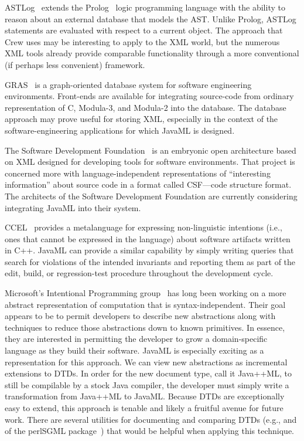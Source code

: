 \documentclass{article}
\begin{document}
\begin{multicols}{2}
ASTLog~\cite{Crew97} extends the Prolog~\cite{Clock94} logic programming
language with the ability to reason about an external database that
models the AST.  Unlike Prolog, ASTLog statements are evaluated with
respect to a current object.  The approach that Crew uses may be
interesting to apply to the XML world, but the numerous XML tools
already provide comparable functionality through a more conventional (if
perhaps less convenient) framework.

GRAS~\cite{Kiesel95} is a graph-oriented database system for software engineering
environments.  Front-ends are available for integrating source-code from
ordinary representation of C, Modula-3, and Modula-2 into the database.  The database 
approach may prove useful for storing XML, especially in the context of
the software-engineering applications for which JavaML is designed.

The Software Development Foundation~\cite{SDS} is an embryonic open
architecture based on XML designed for developing tools for software
environments.  That project is concerned more with language-independent
representations of ``interesting information'' about source code in a
format called CSF---code structure format.  The architects of the
Software Development Foundation are currently considering integrating
JavaML into their system.

CCEL~\cite{CCEL92} provides a metalanguage for expressing non-linguistic
intentions (i.e., ones that cannot be expressed in the language) about
software artifacts written in C++.  JavaML can provide a similar
capability by simply writing queries that search for violations of the
intended invariants and reporting them as part of the edit, build, or
regression-test procedure throughout the development cycle.

Microsoft's Intentional Programming group~\cite{Simonyi96} has long been
working on a more abstract representation of computation that is
syntax-independent.  Their goal appears to be to permit developers to
describe new abstractions along with techniques to reduce those
abstractions down to known primitives.  In essence, they are interested
in permitting the developer to grow a domain-specific language as they
build their software.  JavaML is especially exciting as a representation
for this approach.  We can view new abstractions as incremental
extensions to DTDs.  In order for the new document type, call it
Java++ML, to still be compilable by a stock Java compiler, the developer
must simply write a transformation from Java++ML to JavaML.  Because
DTDs are exceptionally easy to extend, this approach is tenable and
likely a fruitful avenue for future work.  There are several utilities
for documenting and comparing DTDs (e.g.,  and
 of the perlSGML package~\cite{perlSGML}) that would
be helpful when applying this technique.



\end{multicols}
\end{document}
